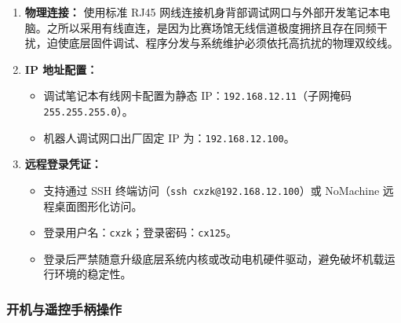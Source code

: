 \begin{enumerate}[leftmargin=*]
    \item \textbf{物理连接：} 使用标准 RJ45 网线连接机身背部调试网口与外部开发笔记本电脑。之所以采用有线直连，是因为比赛场馆无线信道极度拥挤且存在同频干扰，迫使底层固件调试、程序分发与系统维护必须依托高抗扰的物理双绞线。
    \item \textbf{IP 地址配置：}
    \begin{itemize}
        \item 调试笔记本有线网卡配置为静态 IP：\texttt{192.168.12.11}（子网掩码 \texttt{255.255.255.0}）。
        \item 机器人调试网口出厂固定 IP 为：\texttt{192.168.12.100}。
    \end{itemize}
    \item \textbf{远程登录凭证：}
    \begin{itemize}
        \item 支持通过 SSH 终端访问（\texttt{ssh cxzk@192.168.12.100}）或 NoMachine 远程桌面图形化访问。
        \item 登录用户名：\texttt{cxzk}；登录密码：\texttt{cx125}。
        \item 登录后严禁随意升级底层系统内核或改动电机硬件驱动，避免破坏机载运行环境的稳定性。
    \end{itemize}
\end{enumerate}

\subsubsection{开机与遥控手柄操作}

